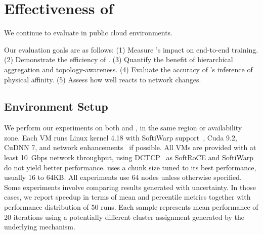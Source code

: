\section{Effectiveness of \plink}
We continue to evaluate \plink in public cloud environments. 

Our evaluation goals are as follows: (1) Measure \plink{}'s impact on end-to-end training.  (2) Demonstrate the efficiency of \ha. (3) Quantify the benefit of hierarchical aggregation and topology-awareness. (4) Evaluate the accuracy of \marcopolo{}'s inference of physical affinity. (5) Assess how well \autoplink reacts to network changes. 

\subsection{Environment Setup}
\label{sec:commBackend}
We perform our experiments on both \azure and \ectwo, in the same region or availability zone. Each VM runs Linux kernel 4.18 with SoftiWarp support~\cite{zrliosof32:online}, Cuda 9.2, CuDNN 7, and network enhancements~\cite{Createan37:online, Enablean80:online} if possible. All VMs are provided with at least 10~Gbps network throughput, using DCTCP~\cite{data-center-tcp-dctcp} as SoftRoCE and SoftiWarp do not yield better performance. \ha uses a chunk size tuned to its best performance, usually 16 to 64KB. All experiments use 64 nodes unless otherwise specified. Some experiments involve comparing results generated with uncertainty. In those cases, we report speedup in terms of mean and percentile metrics together with performance distribution of 50 runs. Each sample represents mean performance of 20 iterations using a potentially different cluster assignment generated by the underlying mechanism. %


